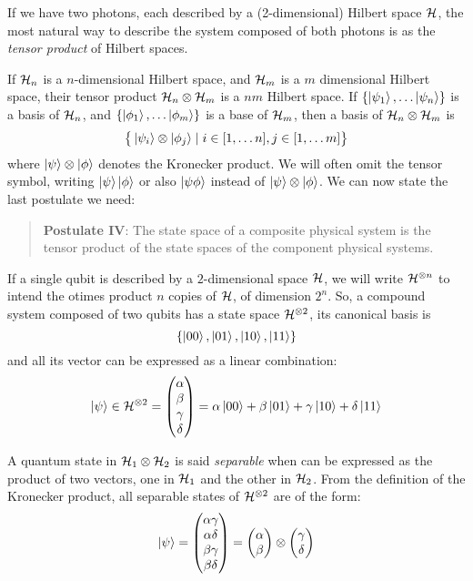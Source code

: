 If we have two photons, each described by a (2-dimensional) Hilbert space $\mathcal{H}$, the most natural way to describe the system composed of both photons is as the \textit{tensor product} of Hilbert spaces.	

If $\mathcal{H}_n$ is a $n$-dimensional Hilbert space, and $\mathcal{H}_m$ is a $m$ dimensional Hilbert space, their tensor product $\mathcal{H}_n \otimes \mathcal{H}_m$ is a $nm$ Hilbert space. If $\{\ket{\psi_1}, \ldots \ket{\psi_n}\}$ is a basis of $\mathcal{H}_n$, and $\{\ket{\phi_1}, \ldots\ket{\phi_m}\}$ is a base of $\mathcal{H}_m$, then a basis of $\mathcal{H}_n \otimes \mathcal{H}_m$ is\[\big\{\ket{\psi_i}\otimes\ket{\phi_j} \mid i \in [1, \ldots n], j \in [1, \ldots m] \big\}\]
 where $\ket{\psi} \otimes \ket{\phi}$ denotes the Kronecker product. We will often omit the tensor symbol, writing $\ket{\psi}\ket{\phi}$ or also $\ket{\psi\phi}$ instead of $\ket{\psi}\otimes\ket{\phi}$. We can now state the last postulate we need:

\begin{quote}
\textbf{Postulate IV}: The state space of a composite physical system is the tensor product of the state spaces of the component physical systems. 
\end{quote}

If a single qubit is described by a $2$-dimensional space $\mathcal{H}$, we will write $\mathcal{H}^{\otimes n}$ to intend the otimes product $n$ copies of $\mathcal{H}$, of dimension $2^n$. So, a compound system composed of two qubits has a state space $\mathcal{H}^{\otimes 2}$, its canonical basis is 
\[\{\ket{00}, \ket{01}, \ket{10}, \ket{11}\}\]
and all its vector can be expressed as a linear combination:
\[\ket{\psi} \in \mathcal{H}^{\otimes 2} = \begin{pmatrix}
\alpha \\ \beta \\ \gamma \\ \delta
\end{pmatrix} = \alpha\ket{00} + \beta\ket{01} + \gamma\ket{10} + \delta\ket{11}\]

A quantum state in $\mathcal{H}_1 \otimes \mathcal{H}_2$ is said \textit{separable} when can be expressed as the product of two vectors, one in $\mathcal{H}_1$ and the other in $\mathcal{H}_2$. From the definition of the Kronecker product, all separable states of $\mathcal{H}^{\otimes 2}$ are of the form:
\[
 \ket{\psi} = \begin{pmatrix}
 \alpha\gamma \\ \alpha\delta \\ \beta\gamma \\ \beta\delta
 \end{pmatrix} = 
 \begin{pmatrix}
 \alpha \\ \beta
 \end{pmatrix} \otimes 
 \begin{pmatrix}
 \gamma \\ \delta
 \end{pmatrix}
\]

